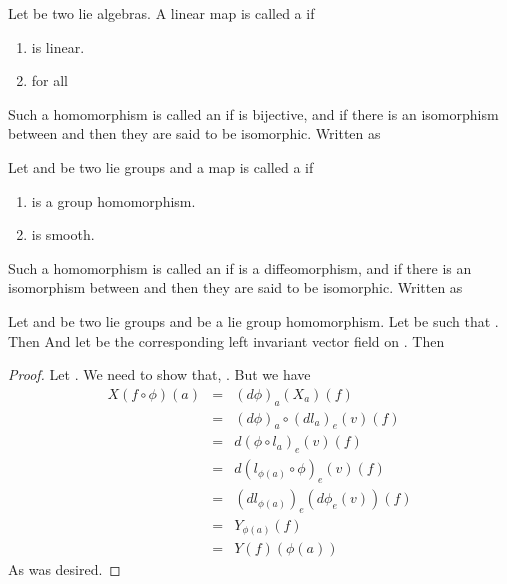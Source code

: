 \documentclass{article}
\begin{document}
\begin{definition}
    Let  be two lie algebras. A linear map  is called a  if
    \begin{enumerate}
        \item \mm{\phi} is linear.
        \item {} for all  
    \end{enumerate}
    Such a homomorphism is called an  if  is bijective, and if there is an isomorphism between  and  then
    they are said to be isomorphic. Written as 
\end{definition}

\begin{definition}
    Let  and  be two lie groups and a map  is called a  if
    \begin{enumerate}
        \item \mm{\phi} is a group homomorphism.
        \item \mm{\phi} is smooth.
    \end{enumerate}
    Such a homomorphism is called an  if \mm{\phi} is a diffeomorphism, and if there is an isomorphism between  and  then they are said to be isomorphic.
    Written as 
\end{definition}

\begin{proposition}
    Let  and  be two lie groups and  be a lie group homomorphism. Let  be such that . Then 
    And let  be the corresponding left invariant vector field on . Then 
\end{proposition}
\begin{proof}
    Let . We need to show that, . But we have
    \begin{eqnarray*}
        X(f\circ\phi)(a) &=& (d\phi)_a(X_a)(f)\\
        &=& (d\phi)_a\circ(dl_a)_e(v)(f)\\
        &=& d(\phi\circ l_a)_e(v)(f)\\
        &=& d(l_{\phi(a)}\circ \phi)_e(v)(f)\\
        &=& (dl_{\phi(a)})_e(d\phi_e(v))(f)\\
        &=& Y_{\phi(a)}(f)\\
        &=& Y(f)(\phi(a))
    \end{eqnarray*}
    As was desired.
\end{proof}
\end{document}
